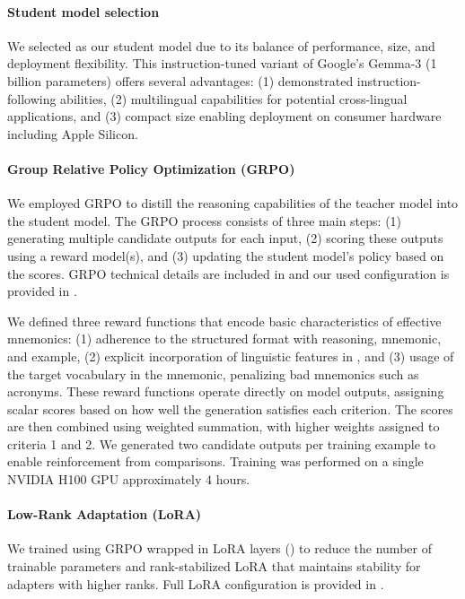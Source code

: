 \paragraph{Student model selection} We selected \studentmodel as our student model due to its balance of performance, size, and deployment flexibility. This instruction-tuned variant of Google's Gemma-3 (1 billion parameters) \citep{GemmaTeamGEMMA2025} offers several advantages: (1) demonstrated instruction-following abilities, (2) multilingual capabilities for potential cross-lingual applications, and (3) compact size enabling deployment on consumer hardware including Apple Silicon.

\paragraph{Group Relative Policy Optimization (GRPO)} We employed GRPO \citep{DeepSeek-AIDEEPSEEKR12025} to distill the reasoning capabilities of the teacher model into the student model. The GRPO process consists of three main steps: (1) generating multiple candidate outputs for each input, (2) scoring these outputs using a reward model(s), and (3) updating the student model's policy based on the scores. GRPO technical details are included in   and our used configuration is provided in .

We defined three reward functions that encode basic characteristics of effective mnemonics:
(1) adherence to the structured format with reasoning, mnemonic, and example,
(2) explicit incorporation of linguistic features in , and
(3) usage of the target vocabulary in the mnemonic,  penalizing bad mnemonics such as acronyms.
These reward functions operate directly on model outputs, assigning scalar scores based on how well the generation satisfies each criterion. The scores are then combined using weighted summation, with higher weights assigned to criteria 1 and 2. We generated two candidate outputs per training example to enable reinforcement from comparisons. Training was performed on a single NVIDIA H100 GPU approximately 4 hours.

\paragraph{Low-Rank Adaptation (LoRA)} We trained \studentmodel using GRPO wrapped in LoRA layers () to reduce the number of trainable parameters and rank-stabilized LoRA that maintains stability for adapters with higher ranks. Full LoRA configuration is provided in .

